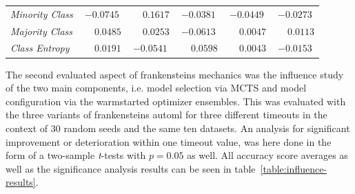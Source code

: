 \begin{table}[ht]
\begin{subtable}{\textwidth}
\begin{tabular}{l|ccccc}
            \textit{Minority Class} & $-0.0745$ & $\phantom{-}0.1617$ & $-0.0381$ & $-0.0449$ & $-0.0273$ \\
            \textit{Majority Class} & $\phantom{-}0.0485$ & $\phantom{-}0.0253$ & $-0.0613$ & $\phantom{-}0.0047$ & $\phantom{-}0.0113$ \\
            \textit{Class Entropy} & $\phantom{-}0.0191$ & $-0.0541$ & $\phantom{-}0.0598$ & $\phantom{-}0.0043$ & $-0.0153$ \\
            \hline
        \end{tabular}
    \end{subtable}
\end{table}

The second evaluated aspect of frankensteins mechanics was the influence study of the two main components, i.e. model selection via MCTS and model configuration via the warmstarted optimizer ensembles.\newline
This was evaluated with the three variants of frankensteins automl for three different timeouts in the context of 30 random seeds and the same ten datasets.
An analysis for significant improvement or deterioration within one timeout value, was here done in the form of a two-sample \textit{t}-tests with $p = 0.05$ as well.\newline
All accuracy score averages as well as the significance analysis results can be seen in table~\ref{table:influence-results}.

